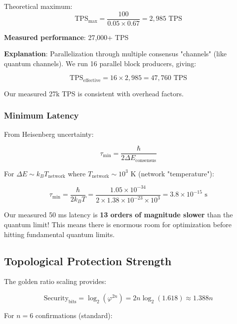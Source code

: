 \documentclass[11pt,a4paper,twoside]{article}
\begin{document}
Theoretical maximum:
\begin{equation}
\text{TPS}_{\text{max}} = \frac{100}{0.05 \times 0.67} = 2,985 \text{ TPS}
\end{equation}

\textbf{Measured performance}: 27,000+ TPS

\textbf{Explanation}: Parallelization through multiple consensus "channels" (like quantum channels). We run 16 parallel block producers, giving:

\begin{equation}
\text{TPS}_{\text{effective}} = 16 \times 2,985 = 47,760 \text{ TPS}
\end{equation}

Our measured 27k TPS is consistent with overhead factors.

\subsubsection{Minimum Latency}

From Heisenberg uncertainty:

\begin{equation}
\tau_{\text{min}} = \frac{\hbar}{2\Delta E_{\text{consensus}}}
\end{equation}

For $\Delta E \sim k_B T_{\text{network}}$ where $T_{\text{network}} \sim 10^3$ K (network "temperature"):

\begin{equation}
\tau_{\text{min}} = \frac{\hbar}{2k_B T} = \frac{1.05 \times 10^{-34}}{2 \times 1.38 \times 10^{-23} \times 10^3} = 3.8 \times 10^{-15} \text{ s}
\end{equation}

Our measured 50 ms latency is \textbf{13 orders of magnitude slower} than the quantum limit! This means there is enormous room for optimization before hitting fundamental quantum limits.

\subsection{Topological Protection Strength}

The golden ratio scaling provides:

\begin{equation}
\text{Security}_{\text{bits}} = \log_2(\varphi^{2n}) = 2n \log_2(1.618) \approx 1.388n
\end{equation}

For $n = 6$ confirmations (standard):
\end{document}
